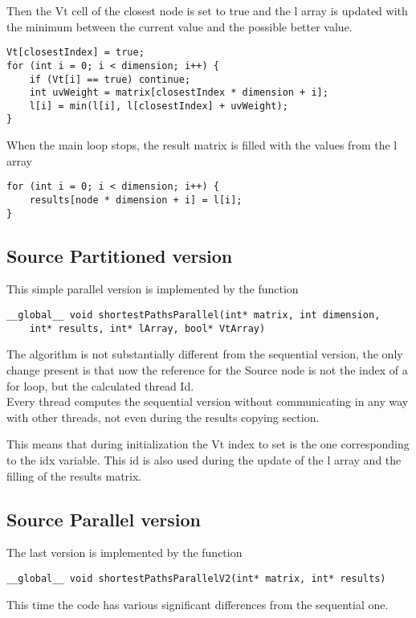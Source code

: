 \documentclass[
	a4paper, %
	12pt, %
]{class}
\begin{document}
Then the Vt cell of the closest node is set to true and the l array is updated with the minimum between the current value and the
possible better value.
\begin{verbatim}
Vt[closestIndex] = true;
for (int i = 0; i < dimension; i++) {
    if (Vt[i] == true) continue;
    int uvWeight = matrix[closestIndex * dimension + i];
    l[i] = min(l[i], l[closestIndex] + uvWeight);
}
\end{verbatim}

When the main loop stops, the result matrix is filled with the values from the l array
\begin{verbatim}
for (int i = 0; i < dimension; i++) {
    results[node * dimension + i] = l[i];
}
\end{verbatim}

\subsection{Source Partitioned version}
This simple parallel version is implemented by the function
\begin{verbatim}
__global__ void shortestPathsParallel(int* matrix, int dimension,
    int* results, int* lArray, bool* VtArray)
\end{verbatim}

The algorithm is not substantially different from the sequential version, the only change present is that now the reference for the
Source node is not the index of a for loop, but the calculated thread Id.\\

Every thread computes the sequential version without communicating in any way with other threads, not even during
the results copying section.

This means that during initialization the Vt index to set is the one corresponding to the idx variable. This id is also used during the
update of the l array and the filling of the results matrix.\\

\subsection{Source Parallel version}
The last version is implemented by the function
\begin{verbatim}
__global__ void shortestPathsParallelV2(int* matrix, int* results)
\end{verbatim}

This time the code has various significant differences from the sequential one.\\
\end{document}
